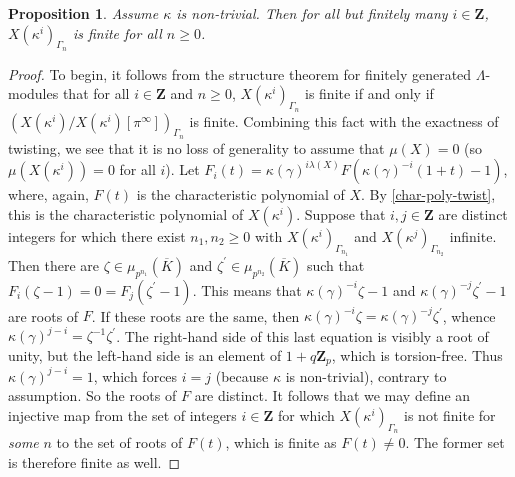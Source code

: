 \documentclass[12 pt]{amsart}
\theoremstyle{plain}
\newtheorem{prop}[thm]{Proposition}
\theoremstyle{definition}
\numberwithin{equation}{section}
\numberwithin{table}{section}
\begin{document}
\begin{prop}
\label{finite-inv}
Assume $\kappa$ is non-trivial. Then for all but finitely many $i\in\mathbf{Z}$, $X(\kappa^i)_{\Gamma_n}$ is finite for all $n\geq 0$.
\end{prop}
\begin{proof}
To begin, it follows from the structure theorem for finitely generated $\Lambda$-modules that for all $i\in\mathbf{Z}$ and $n\geq 0$, $X(\kappa^i)_{\Gamma_n}$ is finite if and only if $(X(\kappa^i)/X(\kappa^i)[\pi^\infty])_{\Gamma_n}$ is finite. Combining this fact with the exactness of twisting, we see that it is no loss of generality to assume that $\mu(X)=0$ (so $\mu(X(\kappa^i))=0$ for all $i$). Let $F_i(t)=\kappa(\gamma)^{i\lambda(X)}F(\kappa(\gamma)^{-i}(1+t)-1)$, where, again, $F(t)$ is the characteristic polynomial of $X$. By \cref{char-poly-twist}, this is the characteristic polynomial of $X(\kappa^i)$. Suppose that $i,j\in\mathbf{Z}$ are distinct integers for which there exist $n_1,n_2\geq 0$ with $X(\kappa^i)_{\Gamma_{n_1}}$ and $X(\kappa^j)_{\Gamma_{n_2}}$ infinite. Then there are $\zeta\in\mu_{p^{n_1}}(\overline{K})$ and $\zeta^\prime\in\mu_{p^{n_2}}(\overline{K})$ such that $F_i(\zeta-1)=0=F_j(\zeta^\prime-1)$. This means that $\kappa(\gamma)^{-i}\zeta-1$ and $\kappa(\gamma)^{-j}\zeta^\prime-1$ are roots of $F$. If these roots are the same, then $\kappa(\gamma)^{-i}\zeta=\kappa(\gamma)^{-j}\zeta^\prime$, whence $\kappa(\gamma)^{j-i}=\zeta^{-1}\zeta^\prime$. The right-hand side of this last equation is visibly a root of unity, but the left-hand side is an element of $1+q\mathbf{Z}_p$, which is torsion-free. Thus $\kappa(\gamma)^{j-i}=1$, which forces $i=j$ (because $\kappa$ is non-trivial), contrary to assumption. So the roots of $F$ are distinct. It follows that we may define an injective map from the set of integers $i\in\mathbf{Z}$ for which $X(\kappa^i)_{\Gamma_n}$ is not finite for \emph{some} $n$ to the set of roots of $F(t)$, which is finite as $F(t)\neq 0$. The former set is therefore finite as well.
\end{proof}
\end{document}
